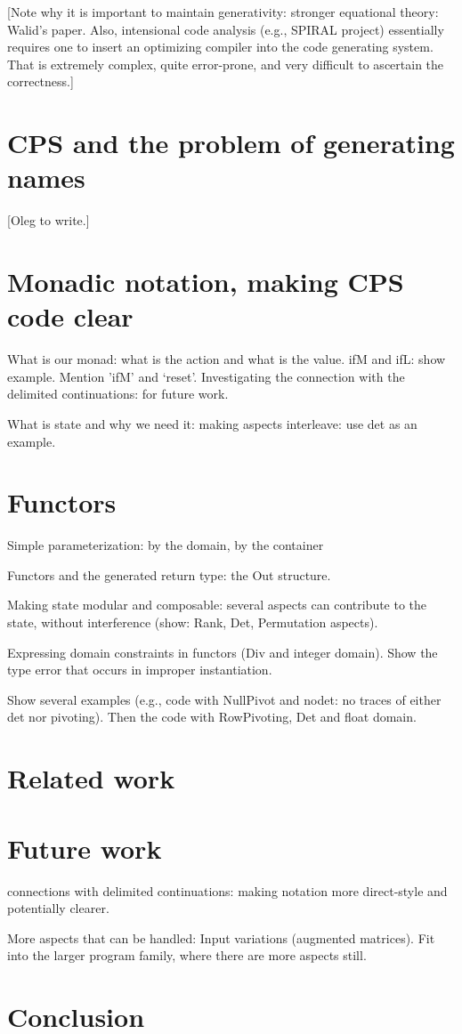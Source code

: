 \documentclass[11pt]{llncs}
\begin{document}
[Note why it is important to maintain generativity: stronger
equational theory: Walid's paper. Also, intensional code analysis
(e.g., SPIRAL project) essentially requires one to insert an
optimizing compiler into the code generating system. That is extremely
complex, quite error-prone, and very difficult to ascertain the
correctness.]

\section{CPS and the problem of generating names}

[Oleg to write.]

\section{Monadic notation, making CPS code clear}

What is our monad: what is the action and what is the value.
ifM and ifL: show example. Mention 'ifM' and `reset'. Investigating
the connection with the delimited continuations: for future work.

What is state and why we need it: making aspects interleave: use det
as an example.

\section{Functors}

Simple parameterization: by the domain, by the container
 
Functors and the generated return type: the Out structure.

Making state modular and composable: several aspects can contribute
to the state, without interference (show: Rank, Det, Permutation
aspects).

Expressing domain constraints in functors (Div and integer domain).
Show the type error that occurs in improper instantiation.

Show several examples (e.g., code with NullPivot and nodet: no traces
of either det nor pivoting). Then the code with RowPivoting, Det and
float domain. 

\section{Related work}

\section{Future work}
connections with delimited continuations: making notation
more direct-style and potentially clearer.

More aspects that can be handled: Input variations (augmented 
matrices).  Fit into the larger program family, where there are
more aspects still.

\section{Conclusion}

 

\end{document}
